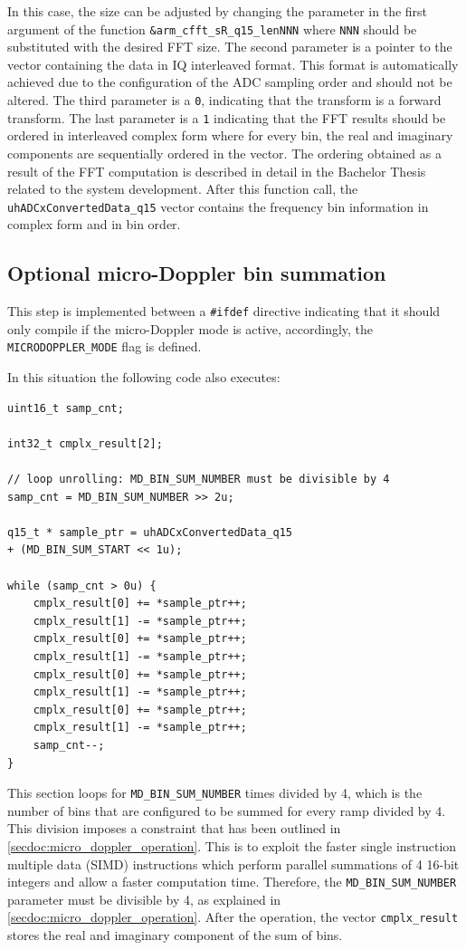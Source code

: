 In this case, the size can be adjusted by changing the parameter in the first argument of the function \texttt{\&arm\_cfft\_sR\_q15\_lenNNN} where \texttt{NNN} should be substituted with the desired FFT size. The second parameter is a pointer to the vector containing the data in IQ interleaved format. This format is automatically achieved due to the configuration of the ADC sampling order and should not be altered. The third parameter is a \texttt{0}, indicating that the transform is a forward transform. The last parameter is a \texttt{1} indicating that the FFT results should be ordered in interleaved complex form where for every bin, the real and imaginary components are sequentially ordered in the vector. The ordering obtained as a result of the FFT computation is described in detail in the Bachelor Thesis related to the system development. After this function call, the \texttt{uhADCxConvertedData\_q15} vector contains the frequency bin information in complex form and in bin order.

\subsection{Optional micro-Doppler bin summation}

This step is implemented between a \texttt{\#ifdef} directive indicating that it should only compile if the micro-Doppler mode is active, accordingly, the \texttt{MICRODOPPLER\_MODE} flag is defined.

In this situation the following code also executes:
\begin{verbatim}
uint16_t samp_cnt;

int32_t cmplx_result[2];

// loop unrolling: MD_BIN_SUM_NUMBER must be divisible by 4
samp_cnt = MD_BIN_SUM_NUMBER >> 2u;

q15_t * sample_ptr = uhADCxConvertedData_q15
+ (MD_BIN_SUM_START << 1u);

while (samp_cnt > 0u) {
	cmplx_result[0] += *sample_ptr++;
	cmplx_result[1] -= *sample_ptr++;
	cmplx_result[0] += *sample_ptr++;
	cmplx_result[1] -= *sample_ptr++;
	cmplx_result[0] += *sample_ptr++;
	cmplx_result[1] -= *sample_ptr++;
	cmplx_result[0] += *sample_ptr++;
	cmplx_result[1] -= *sample_ptr++;
	samp_cnt--;
}
\end{verbatim}

This section loops for \texttt{MD\_BIN\_SUM\_NUMBER} times divided by 4, which is the number of bins that are configured to be summed for every ramp divided by 4. This division imposes a constraint that has been outlined in \cref{secdoc:micro_doppler_operation}. This is to exploit the faster single instruction multiple data (SIMD) instructions which perform parallel summations of 4 16-bit integers and allow a faster computation time. Therefore, the \texttt{MD\_BIN\_SUM\_NUMBER} parameter must be divisible by 4, as explained in \cref{secdoc:micro_doppler_operation}. After the operation, the vector \texttt{cmplx\_result} stores the real and imaginary component of the sum of bins.

